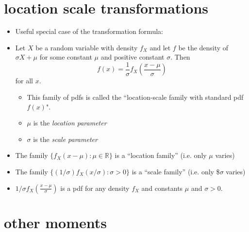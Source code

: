 \documentclass[11pt]{article}
\begin{document}
\section{location scale transformations}
\label{sec-4}

\begin{itemize}
\item Useful special case of the transformation formula:
\item Let $X$ be a random variable with density $f_X$ and let $f$ be
      the density of $\sigma X + \mu$ for some constant $\mu$ and
      positive constant $\sigma$.  Then \[f(x) = \frac{1}{\sigma}
      f_X\left(\frac{x - \mu}{\sigma}\right)\] for all $x$.
\begin{itemize}
\item This family of pdfs is called the ``location-scale family
        with standard pdf $f(x)$".
\item $\mu$ is the \emph{location parameter}
\item $\sigma$ is the \emph{scale parameter}
\end{itemize}
\item The family $\{f_X(x - \mu) : \mu \in \mathbb{R}\}$ is a
      ``location family'' (i.e. only $\mu$ varies)
\item The family $\{(1/\sigma) f_X(x/\sigma) : \sigma > 0\}$ is a
      ``scale family'' (i.e. only \$$\sigma$ varies)
\item $1/\sigma f_X(\frac{x - \mu}{\sigma})$ is a pdf for any density
      $f_X$ and constants $\mu$ and $\sigma > 0$.
\end{itemize}
\section{other moments}
\label{sec-5}
\end{document}
